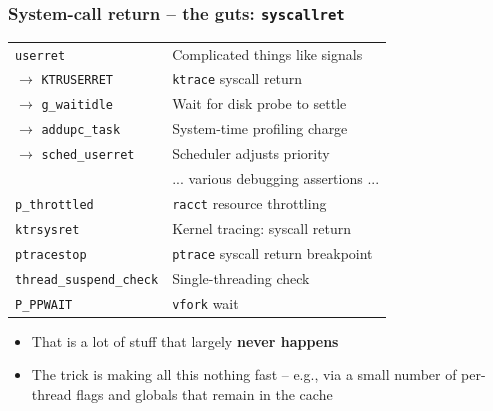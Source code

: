 \begin{frame}
  \frametitle{System-call return -- the guts: \texttt{syscallret}}

  \begin{tabular}{ll}
  \texttt{userret} & Complicated things like signals \\

  \pause
  $\rightarrow$
    \texttt{KTRUSERRET} & \texttt{ktrace} syscall return \\

  \pause

  $\rightarrow$
    \texttt{g\_waitidle} & Wait for disk probe to settle \\

  \pause

  $\rightarrow$
    \texttt{addupc\_task} & System-time profiling charge \\

  \pause

  $\rightarrow$
    \texttt{sched\_userret} & Scheduler adjusts priority \\

  \pause
  \medskip

  & {... various debugging assertions ...} \\

  \pause

  \texttt{p\_throttled} & \texttt{racct} resource throttling \\

  \pause

  \texttt{ktrsysret} & Kernel tracing: syscall return \\

  \pause

  \texttt{ptracestop} & \texttt{ptrace} syscall return breakpoint \\

  \pause

  \texttt{thread\_suspend\_check} & Single-threading check \\

  \pause

  \texttt{P\_PPWAIT} & \texttt{vfork} wait \\
  \end{tabular}

  \pause
  \medskip

  \begin{itemize}
    \item That is a lot of stuff that largely \textbf{never happens}
    \item The trick is making all this nothing fast -- e.g., via a small
      number of per-thread flags and globals that remain in the cache
  \end{itemize}
\end{frame}

